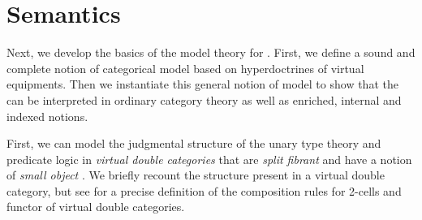 \documentclass{llncs}
\begin{document}
\section{Semantics}
\label{sec:semantics}

Next, we develop the basics of the model theory for \ohol{}.
%
First, we define a sound and complete notion of categorical model
based on hyperdoctrines of virtual equipments.
%
Then we instantiate this general notion of model to show that the
\ohol{} can be interpreted in ordinary category theory as well as
enriched, internal and indexed notions.


First, we can model the judgmental structure of the unary type theory
and predicate logic in \emph{virtual double categories} that are
\emph{split fibrant} and have a notion of \emph{small object}
\cite{LEINSTER2002391,Cruttwell2010}. We briefly recount the structure
present in a virtual double category, but see \citet{Cruttwell2010}
for a precise definition of the composition rules for 2-cells and
functor of virtual double categories.
\end{document}
